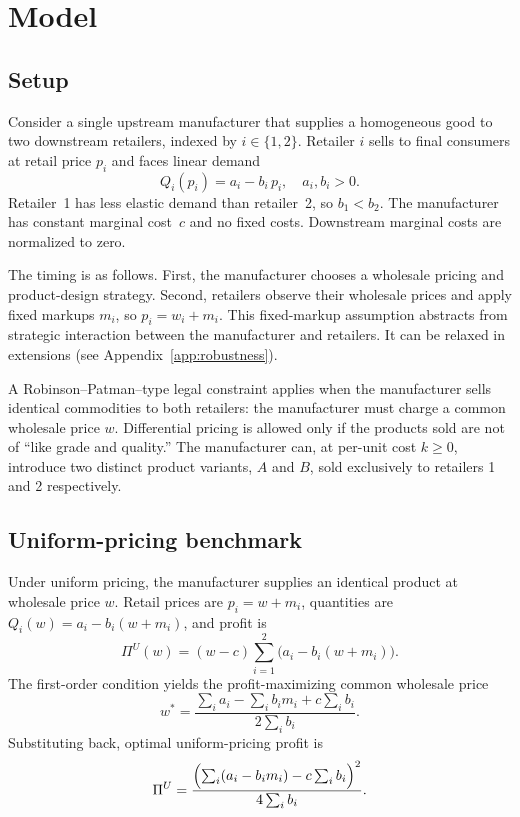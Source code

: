 \documentclass[12pt]{article}
\theoremstyle{definition}
\begin{document}
\section{Model}\label{sec:model}

\subsection{Setup}

Consider a single upstream manufacturer that supplies a homogeneous good to two downstream retailers, indexed by $i \in \{1,2\}$.
Retailer $i$ sells to final consumers at retail price $p_i$ and faces linear demand
\begin{equation}\label{eq:demand}
Q_i(p_i) = a_i - b_i\, p_i, \quad a_i, b_i > 0.
\end{equation}
Retailer~1 has less elastic demand than retailer~2, so $b_1 < b_2$.
The manufacturer has constant marginal cost~$c$ and no fixed costs. Downstream marginal costs are normalized to zero.

The timing is as follows.
First, the manufacturer chooses a wholesale pricing and product-design strategy.
Second, retailers observe their wholesale prices and apply fixed markups $m_i$, so $p_i = w_i + m_i$.
This fixed-markup assumption abstracts from strategic interaction between the manufacturer and retailers. It can be relaxed in extensions (see Appendix~\ref{app:robustness}).

A Robinson--Patman--type legal constraint applies when the manufacturer sells identical commodities to both retailers: the manufacturer must charge a common wholesale price $w$.
Differential pricing is allowed only if the products sold are not of ``like grade and quality.''
The manufacturer can, at per-unit cost $k \ge 0$, introduce two distinct product variants, $A$ and $B$, sold exclusively to retailers 1 and 2 respectively.

\subsection{Uniform-pricing benchmark}

Under uniform pricing, the manufacturer supplies an identical product at wholesale price $w$.
Retail prices are $p_i = w + m_i$, quantities are $Q_i(w) = a_i - b_i(w + m_i)$, and profit is
\begin{equation}\label{eq:pi_u_fn}
\Pi^U(w) = (w - c)\sum_{i=1}^{2}\bigl(a_i - b_i(w + m_i)\bigr).
\end{equation}
The first-order condition yields the profit-maximizing common wholesale price
\begin{equation}\label{eq:wstar}
w^* = \frac{\sum_{i} a_i - \sum_{i} b_i m_i + c\sum_{i} b_i}{2\sum_{i} b_i}.
\end{equation}
Substituting back, optimal uniform-pricing profit is
\begin{equation}\label{eq:pi_u}
\Pi^U = \frac{\Bigl(\sum_i (a_i - b_i m_i) - c\sum_i b_i\Bigr)^2}{4\sum_i b_i}.
\end{equation}
\end{document}
